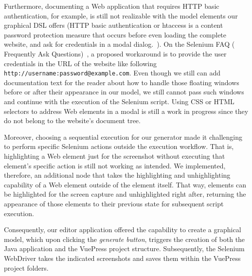 Furthermore, documenting a Web application that requires HTTP basic authentication, for example, is still not realizable with the model elements our graphical DSL offers (HTTP basic authentication or htaccess is a content password protection measure that occurs before even loading the complete website, and ask for credentials in a modal dialog.~\cite{htaccess}). On the Selenium FAQ ( Frequently Ask Questions)~\cite{SeleniumFAQ}, a proposed workaround is to provide the user credentials in the URL of the website like following \lstinline{http://username:password@example.com}. Even though we still can add documentation text for the reader about how to handle those floating windows before or after their appearance in our model, we still cannot pass such windows and continue with the execution of the Selenium script. Using CSS or HTML selectors to address Web elements in a modal is still a work in progress since they do not belong to the website's document tree.

Moreover, choosing a sequential execution for our generator made it challenging to perform specific Selenium actions outside the execution workflow. That is, highlighting a Web element just for the screenshot without executing that element's specific action is still not working as intended. We implemented, therefore, an additional node that takes the highlighting and unhighlighting capability of a Web element outside of the element itself. That way, elements can be highlighted for the screen capture and unhighlighted right after, returning the appearance of those elements to their previous state for subsequent script execution. 

Consequently, our editor application offered the capability to create a graphical model, which upon clicking the \textit{generate button}, triggers the creation of both the Java application and the VuePress project structure. Subsequently, the Selenium WebDriver takes the indicated screenshots and saves them within the VuePress project folders.